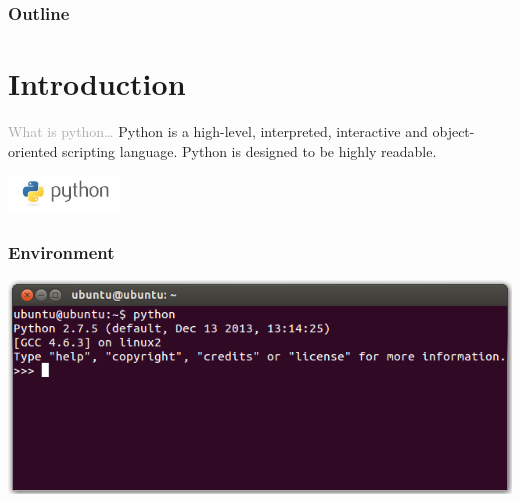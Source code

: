 \documentclass{../py-lecture}
\subtitle{Introduction}
\begin{document}
\begin{frame}
  \titlepage{}
\end{frame}
\begin{frame}
  \frametitle{Outline}
  \tableofcontents{}
\end{frame}

\section{Introduction}

\begin{frame}
  \begin{block}{
      \centering\textcolor{darkgray}{What is python\ldots}}
      Python is a high-level, interpreted, interactive and object-oriented scripting language. Python is designed to be highly readable.
  \end{block}
  \vspace{.75cm}
  \hspace*{8.5cm}\includegraphics[width=3cm]{img/python.jpeg}
\end{frame}

\begin{frame}
	\frametitle{Environment}
	\includegraphics[width=\linewidth]{img/python-console-linux.png}
\end{frame}
\end{document}
